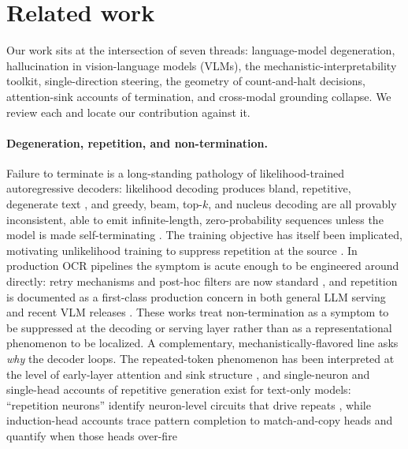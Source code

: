\documentclass[11pt]{article}
\begin{document}
\section{Related work}
\label{sec:related}

Our work sits at the intersection of seven threads: language-model degeneration,
hallucination in vision-language models (VLMs), the mechanistic-interpretability
toolkit, single-direction steering, the geometry of count-and-halt decisions,
attention-sink accounts of termination, and cross-modal grounding collapse. We review
each and locate our contribution against it.

\paragraph{Degeneration, repetition, and non-termination.}
Failure to terminate is a long-standing pathology of likelihood-trained autoregressive
decoders: likelihood decoding produces bland, repetitive, degenerate text
\citep{holtzman2020degeneration}, and greedy, beam, top-$k$, and nucleus decoding are all
provably inconsistent, able to emit infinite-length, zero-probability sequences unless
the model is made self-terminating \citep{welleck2020consistency}. The training objective
has itself been implicated, motivating unlikelihood training to suppress repetition at the
source \citep{welleck2019unlikelihood}. In production OCR pipelines the symptom is acute
enough to be engineered around directly: retry mechanisms and post-hoc filters are now
standard \citep{poznanski2025olmocr,olmocrv2}, and repetition is documented as a
first-class production concern in both general LLM serving
\citep{repetitionproduction2025} and recent VLM releases \citep{internvl35}. These works treat non-termination as a symptom
to be suppressed at the decoding or serving layer rather than as a representational
phenomenon to be localized. A complementary, mechanistically-flavored line asks
\emph{why} the decoder loops. The repeated-token phenomenon has been interpreted at the
level of early-layer attention and sink structure \citep{repeatedtoken2025}, and
single-neuron and single-head accounts of repetitive generation exist for text-only
models: ``repetition neurons'' identify neuron-level circuits that drive repeats
\citep{repetitionneurons2025}, while induction-head accounts trace pattern completion to
match-and-copy heads \citep{olsson2022induction} and quantify when those heads over-fire
\end{document}
